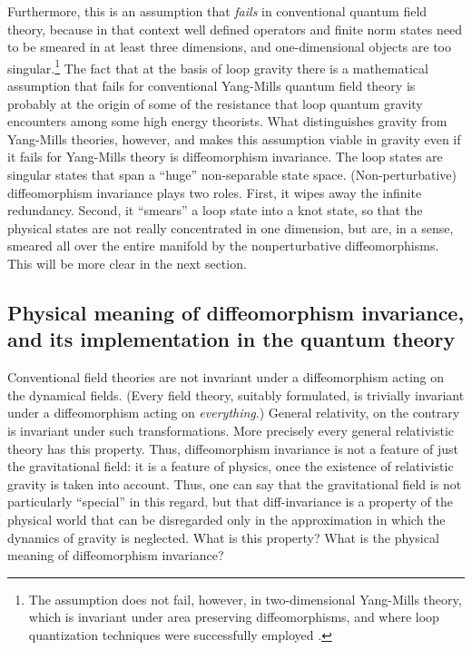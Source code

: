 Furthermore, this is an assumption that {\em fails\/} in conventional 
quantum field theory, because in that context well defined operators 
and finite norm states need to be smeared in at least three 
dimensions, and one-dimensional objects are too singular.\footnote{The 
assumption does not fail, however, in two-dimensional Yang-Mills 
theory, which is invariant under area preserving diffeomorphisms, and 
where loop quantization techniques were successfully employed 
\cite{ALMMT}.} The fact that at the basis of loop gravity there is a 
mathematical assumption that fails for conventional Yang-Mills quantum 
field theory is probably at the origin of some of the resistance that 
loop quantum gravity encounters among some high energy theorists.  
What distinguishes gravity from Yang-Mills theories, however, and 
makes this assumption viable in gravity even if it fails for 
Yang-Mills theory is diffeomorphism invariance.  The loop states are 
singular states that span a ``huge'' non-separable state space.  
(Non-perturbative) diffeomorphism invariance plays two roles.  First, 
it wipes away the infinite redundancy.  Second, it ``smears'' a loop 
state into a knot state, so that the physical states are not really 
concentrated in one dimension, but are, in a sense, smeared all over 
the entire manifold by the nonperturbative diffeomorphisms.  This will 
be more clear in the next section.

\subsection{Physical meaning of diffeomorphism invariance, and 
its implementation in the quantum theory} \label{relational}

Conventional field theories are not invariant under a 
diffeomorphism acting on the dynamical fields.  (Every field 
theory, suitably formulated, is trivially invariant under a 
diffeomorphism acting on {\em everything}.)  General relativity, 
on the contrary is invariant under such transformations.  More 
precisely every general relativistic theory has this property.  
Thus, diffeomorphism invariance is not a feature of just the 
gravitational field: it is a feature of physics, once the 
existence of relativistic gravity is taken into account.  Thus, 
one can say that the gravitational field is not particularly 
``special'' in this regard, but that diff-invariance is a 
property of the physical world that can be disregarded only in 
the approximation in which the dynamics of gravity is neglected.  
What is this property?  What is the physical meaning of 
diffeomorphism invariance?

